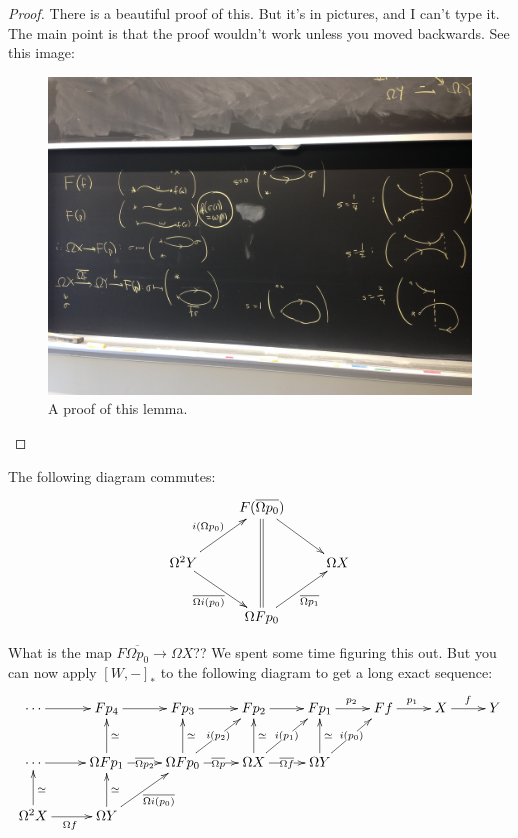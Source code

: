 \begin{proof}
    There is a beautiful proof of this. But it's in pictures, and I can't type it. The main point is that the proof wouldn't work unless you moved backwards. See this image:
\begin{figure}[H]
\centering
\includegraphics[width=\textwidth]{barratt-puppe}
\caption{A proof of this lemma.}
\end{figure}
\end{proof}
\begin{lemma}
    The following diagram commutes:
    \begin{equation*}
	\xymatrix{
	    & F(\overline{\Omega p_0})\ar@{=}[dd]\ar[dr] & \\
	    \Omega^2 Y\ar[ur]^{i(\Omega p_0)}\ar[dr]_{\overline{\Omega i(p_0)}} & & \Omega X\\
	    & \Omega Fp_0\ar[ur]_{\overline{\Omega p_1}} & 
	    }
    \end{equation*}
\end{lemma}
What is the map $F\overline{\Omega p_0}\to \Omega X$?? We spent some time figuring this out. But you can now apply $[W,-]_\ast$ to the following diagram to get a long exact sequence:
\begin{equation*}
    \xymatrix{
	\cdots\ar[r] & Fp_4\ar[r] & Fp_3 \ar[r] & Fp_2\ar[r] & Fp_1\ar[r]^{p_2} & Ff\ar[r]^{p_1} & X\ar[r]^{f} & Y\\
    \cdots\ar[r] & \Omega Fp_1\ar[r]|{\overline{\Omega p_2}}\ar[u]_{\simeq} & \Omega Fp_0\ar[u]_{\simeq}\ar[ur]|{i(p_2)}\ar[r]|{\overline{\Omega p}} & \Omega X\ar[r]|{\overline{\Omega f}}\ar[u]_{\simeq}\ar[ur]|{i(p_1)} & \Omega Y\ar[u]_\simeq \ar[ur]|{i(p_0)} & &\\
	\Omega^2 X\ar[u]_{\simeq}\ar[r]_{\Omega f} & \Omega Y\ar[u]_{\simeq}\ar[ur]_{\overline{\Omega i(p_0)}} & & &
    }
\end{equation*}

